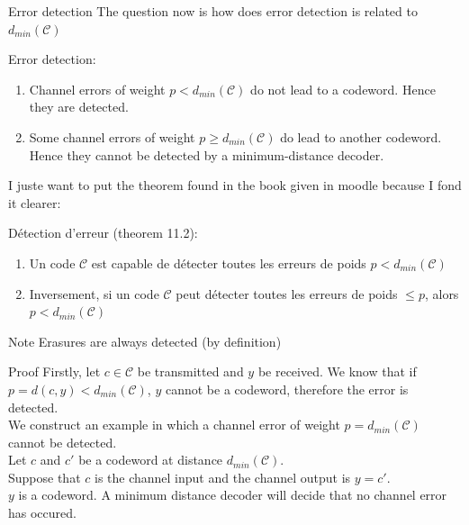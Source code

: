 \begin{parag}{Error detection}
    The question now is how does error detection is related to $d_{min}\left(\mathcal{C}\right)$
    \begin{theoreme}
        Error detection:
        \begin{enumerate}
            \item Channel errors of weight $p < d_{min}\left(\mathcal{C}\right)$ do not lead to a codeword. Hence they are detected.
            \item Some channel errors of weight $p \geq d_{min}\left(\mathcal{C}\right)$ do lead to another codeword. Hence they cannot be detected by a minimum-distance decoder.
        \end{enumerate}
        
    \end{theoreme}
    \begin{framedremark}
        I juste want to put the theorem found in the book given in moodle because I fond it clearer:
    \end{framedremark}
    \begin{theoreme}
    Détection d'erreur (theorem 11.2):
    \begin{enumerate}
        \item Un code $\mathcal{C}$ est capable de détecter toutes les erreurs de poids $p < d_{min}\left(\mathcal{C}\right)$
        \item Inversement, si un code $\mathcal{C}$ peut détecter toutes les erreurs de poids $ \leq p$, alors $p < d_{min}\left(\mathcal{C}\right)$
    \end{enumerate}
    

    \end{theoreme}
    
    \begin{subparag}{Note}
        Erasures are always detected (by definition)
    \end{subparag}
    \begin{subparag}{Proof}
       Firstly, let $c \in \mathcal{C}$ be transmitted and $y$ be received. We know that if $p = d\left(c, y\right) < d_{min}\left(\mathcal{C}\right)$, $y$ cannot be a codeword, therefore the error is detected.\\ 
    We construct an example in which a channel error of weight $p = d_{min}\left(\mathcal{C}\right)$ cannot be detected.\\
    Let $c$ and $c'$ be a codeword at distance $d_{min}\left(\mathcal{C}\right)$.\\
    Suppose that $c$ is the channel input and the channel output is $y = c'$. \\
    $y$ is a codeword. A minimum distance decoder will decide that no channel error has occured.
    \end{subparag}
\end{parag}

